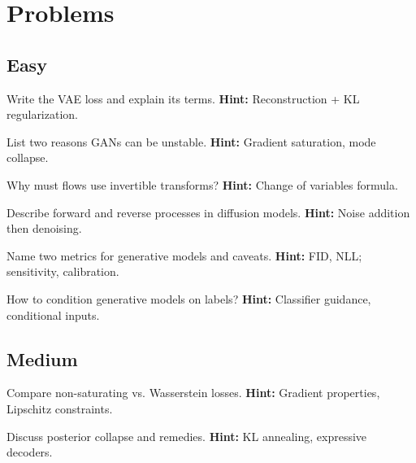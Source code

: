 
\section*{Problems}

\subsection*{Easy}
\begin{problem}
Write the VAE loss and explain its terms.
\textbf{Hint:} Reconstruction + KL regularization.
\end{problem}

\begin{problem}
List two reasons GANs can be unstable.
\textbf{Hint:} Gradient saturation, mode collapse.
\end{problem}

\begin{problem}
Why must flows use invertible transforms?
\textbf{Hint:} Change of variables formula.
\end{problem}

\begin{problem}
Describe forward and reverse processes in diffusion models.
\textbf{Hint:} Noise addition then denoising.
\end{problem}

\begin{problem}[Metrics]
Name two metrics for generative models and caveats.
\textbf{Hint:} FID, NLL; sensitivity, calibration.
\end{problem}

\begin{problem}[Conditioning]
How to condition generative models on labels?
\textbf{Hint:} Classifier guidance, conditional inputs.
\end{problem}

\subsection*{Medium}
\begin{problem}
Compare non-saturating vs. Wasserstein losses.
\textbf{Hint:} Gradient properties, Lipschitz constraints.
\end{problem}

\begin{problem}
Discuss posterior collapse and remedies.
\textbf{Hint:} KL annealing, expressive decoders.
\end{problem}

